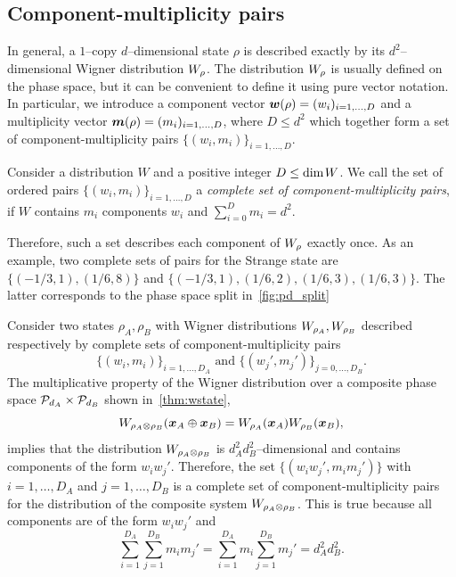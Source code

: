 \subsection{Component-multiplicity pairs}
\label{app:cmpairs}
In general, a $1$--copy $d$--dimensional state $\rho$ is described exactly by its $d^2$--dimensional Wigner distribution $\W{\rho}$. 
The distribution $\W{\rho}$ is usually defined on the phase space, but it can be convenient to define it using pure vector notation. 
In particular, we introduce a component vector $\bmw(\rho) = (w_i)_{i=1,\dots,D}$ and a multiplicity vector $\bmm(\rho) = (m_i)_{i=1,\dots,D}$, where $D \leq d^2$ which together form a set of component-multiplicity pairs $\{(w_i, m_i)\}_{i=1,\dots,D}$.
\begin{definition}
	Consider a distribution $W$ and a positive integer $D \leq {\rm{dim}}\hspace{1pt}W$. 
	We call the set of ordered pairs $\{(w_i, m_i)\}_{i=1,\dots,D}$ a \emph{complete set of component-multiplicity pairs}, if $W$ contains $m_i$ components $w_i$ and $\sum_{i=0}^D m_i = d^2$.
\end{definition}
Therefore, such a set describes each component of $\W{\rho}$ exactly once.
As an example, two complete sets of pairs for the Strange state are $\{( -1/3, 1), ( 1/6, 8)\}$ and $\{(-1/3, 1), (1/6, 2), (1/6, 3), (1/6, 3)\}$.
The latter corresponds to the phase space split in~\cref{fig:pd_split}

Consider two states $\rho_A, \rho_B$ with Wigner distributions $\W{\rho_A}, \W{\rho_B}$ described respectively by complete sets of component-multiplicity pairs 
\begin{equation}
	\{(w_i, m_i)\}_{i=1,\dots,D_A} \text{ and } \{(w_j', m_j')\}_{j=0,\dots,D_B}.
\end{equation}
The multiplicative property of the Wigner distribution over a composite phase space $\cal{P}_{d_A} \times \cal{P}_{d_B}$ shown in~\cref{thm:wstate},
\begin{equation}
	\W[\bmx_A \oplus \bmx_B]{\rho_A \otimes \rho_B} = \W[\bmx_A]{\rho_A}\W[\bmx_B]{\rho_B},
\end{equation}
implies that the distribution $\W{\rho_A \otimes \rho_B}$ is $d_A^2 d_B^2$--dimensional and contains components of the form $w_i w_j'$. 
Therefore, the set $\{(w_i w_j', m_i m_j')\}$ with $i=1,\dots,D_A$ and $j=1,\dots,D_B$ is a complete set of component-multiplicity pairs for the distribution of the composite system $\W{\rho_A \otimes \rho_B}$.
This is true because all components are of the form $w_i w_j'$ and 
\begin{equation*}
	\sum_{i=1}^{D_A}\sum_{j=1}^{D_B} m_i m_j' = \sum_{i=1}^{D_A} m_i \sum_{j=1}^{D_B} m_j' = d_A^2 d_B^2.
\end{equation*}

